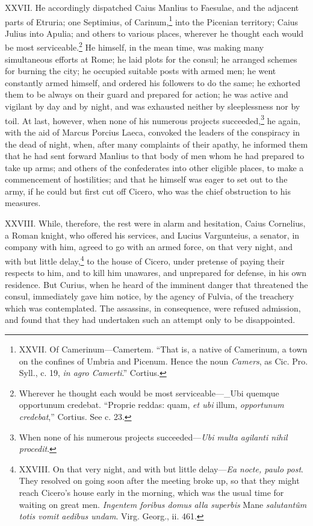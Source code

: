 XXVII. He accordingly dispatched Caius Manlius to Faesulae, and the
adjacent parts of Etruria; one Septimius, of Carinum,\footnote{XXVII. Of Camerinum—Camertem. ``That is, a native of Camerinum,
a town on the confines of Umbria and Picenum. Hence the noun \emph{Camers},
as Cic. Pro. Syll., c. 19, \emph{in agro Camerti}.'' Cortius.} into the
Picenian territory; Caius Julius into Apulia; and others to various
places, wherever he thought each would be most serviceable.\footnote{Wherever he thought each would be most serviceable—\_Ubi
quemque opportunum credebat. ``Proprie reddas: quam, \emph{et ubi} illum,
\emph{opportunum credebat},'' Cortius. See c. 23.} He
himself, in the mean time, was making many simultaneous efforts at
Rome; he laid plots for the consul; he arranged schemes for burning
the city; he occupied suitable posts with armed men; he went constantly
armed himself, and ordered his followers to do the same; he exhorted
them to be always on their guard and prepared for action; he was active
and vigilant by day and by night, and was exhausted neither by
sleeplessness nor by toil. At last, however, when none of his
numerous projects succeeded,\footnote{When none of his numerous projects succeeded—\emph{Ubi multa
agilanti nihil procedit}.} he again, with the aid of Marcus
Porcius Laeca, convoked the leaders of the conspiracy in the dead of
night, when, after many complaints of their apathy, he informed them
that he had sent forward Manlius to that body of men whom he had
prepared to take up arms; and others of the confederates into other
eligible places, to make a commencement of hostilities; and that he
himself was eager to set out to the army, if he could but first cut
off Cicero, who was the chief obstruction to his measures.

XXVIII. While, therefore, the rest were in alarm and hesitation, Caius
Cornelius, a Roman knight, who offered his services, and Lucius
Vargunteius, a senator, in company with him, agreed to go with an
armed force, on that very night, and with but little delay,\footnote{XXVIII. On that very night, and with but little delay—\emph{Ea
nocte, paulo post}. They resolved on going soon after the meeting
broke up, so that they might reach Cicero's house early in the
morning, which was the usual time for waiting on great men. \emph{Ingentem
foribus domus alla superbis} Mane \emph{salutantûm totis vomit aedibus
undam}. Virg. Georg., ii. 461.} to
the house of Cicero, under pretense of paying their respects to him,
and to kill him unawares, and unprepared for defense, in his own
residence. But Curius, when he heard of the imminent danger that
threatened the consul, immediately gave him notice, by the agency of
Fulvia, of the treachery which was contemplated. The assassins, in
consequence, were refused admission, and found that they had
undertaken such an attempt only to be disappointed.

